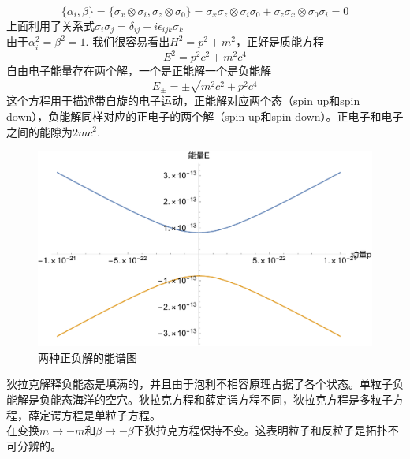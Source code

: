 \documentclass{article}
\numberwithin{equation}{subsection}
\begin{document}
    \begin{equation}
        \{\alpha_i,\beta\}=\{\sigma_x\otimes\sigma_i,\sigma_z\otimes\sigma_0\}=\sigma_x\sigma_z\otimes\sigma_i\sigma_0+\sigma_z\sigma_x\otimes\sigma_0\sigma_i=0
    \end{equation}
    上面利用了关系式$\sigma_i\sigma_j=\delta_{ij}+i\epsilon_{ijk}\sigma_k$\\
    由于$\alpha_i^2=\beta^2=1$. 我们很容易看出$H^2=p^2+m^2$，正好是质能方程
    \begin{equation}
        E^2=p^2c^2+m^2c^4
    \end{equation}
    自由电子能量存在两个解，一个是正能解一个是负能解
    \begin{equation}
        E_{\pm}=\pm\sqrt{m^2c^2+p^2c^4}
    \end{equation}
    这个方程用于描述带自旋的电子运动，正能解对应两个态（spin up和spin down），负能解同样对应的正电子的两个解（spin up和spin down）。正电子和电子之间的能隙为$2mc^2$.
\begin{figure}[h]
  \centering
  \includegraphics[width=5in]{dirac1.pdf}
  \caption{两种正负解的能谱图}\label{dirac pic 1}
\end{figure}
    狄拉克解释负能态是填满的，并且由于泡利不相容原理占据了各个状态。单粒子负能解是负能态海洋的空穴。狄拉克方程和薛定谔方程不同，狄拉克方程是多粒子方程，薛定谔方程是单粒子方程。\\
    在变换$m\rightarrow-m$和$\beta\rightarrow-\beta$下狄拉克方程保持不变。这表明粒子和反粒子是拓扑不可分辨的。
\end{document}
